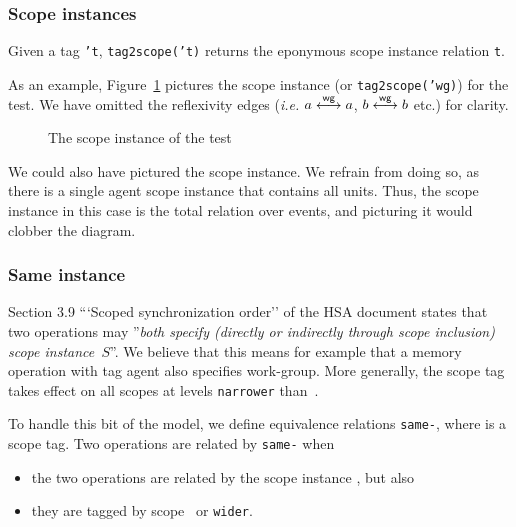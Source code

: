 \subsubsection{Scope instances}
Given a tag \texttt{'t}, \texttt{tag2scope('t)} returns the eponymous scope
instance relation {\tt t}.

As an example, Figure~\ref{isa2scopes} pictures the \wg{} scope instance (or
{\tt tag2scope('wg)}) for the  test.
We have omitted the reflexivity edges (\emph{i.e.} $a \stackrel{\textsf{\scriptsize{}wg}}{\longleftrightarrow} a$, $b \stackrel{\textsf{\scriptsize{}wg}}{\longleftrightarrow} b$ etc.) for clarity.
\begin{figure}[!h]
\begin{center}\moveback
{}
\end{center}
\caption{\label{isa2scopes} The \wg{} scope instance of the  test \color{green}{(Allowed)}}
\end{figure}

We could also have pictured the \agent{} scope instance. We refrain from doing
so, as there is a single agent scope instance that contains all units.  Thus,
the \agent{} scope instance in this case is the total relation over events, and
picturing it would clobber the diagram.


\subsubsection{Same instance}

Section 3.9 ```Scoped synchronization order'' of the HSA document states that
two operations may ''\emph{both specify (directly or indirectly through scope
inclusion) scope instance~$S$}''. We believe that this means for example that a
memory operation with tag agent also specifies work-group. More generally, the
scope tag~ takes effect on all scopes at levels {\tt narrower}
than~. %

To handle this bit of the model, we define equivalence relations
\texttt{same-}, where  is a scope tag. Two operations
are related by \texttt{same-} when
\begin{itemize}
\item the two operations are related by the scope instance , but
also
\item they are tagged by scope~ or {\tt wider}.
\end{itemize}

